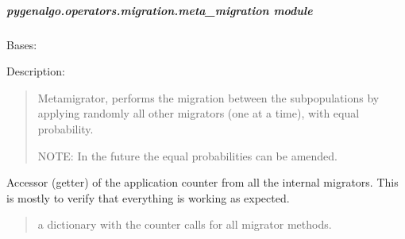\documentclass[letterpaper,10pt,english]{sphinxmanual}
\begin{document}
\subparagraph{pygenalgo.operators.migration.meta\_migration module}
\label{\detokenize{pygenalgo.operators.migration:module-pygenalgo.operators.migration.meta_migration}}\label{\detokenize{pygenalgo.operators.migration:pygenalgo-operators-migration-meta-migration-module}}

\begin{fulllineitems}
\label{\detokenize{pygenalgo.operators.migration:pygenalgo.operators.migration.meta_migration.MetaMigration}}
\pysigstartsignatures
{}
\pysigstopsignatures
\sphinxAtStartPar
Bases: {\hyperref[\detokenize{pygenalgo.operators.migration:pygenalgo.operators.migration.migration_operator.MigrationOperator}]{}}

\sphinxAtStartPar
Description:
\begin{quote}

\sphinxAtStartPar
Meta\sphinxhyphen{}migrator, performs the migration between the subpopulations by applying
randomly all other migrators (one at a time), with equal probability.

\sphinxAtStartPar
NOTE: In the future the equal probabilities can be amended.
\end{quote}

\begin{fulllineitems}
\label{\detokenize{pygenalgo.operators.migration:pygenalgo.operators.migration.meta_migration.MetaMigration.all_counters}}
\pysigstartsignatures
{}
\pysigstopsignatures
\sphinxAtStartPar
Accessor (getter) of the application counter from all the internal migrators.
This is mostly to verify that everything is working as expected.
\begin{quote}\begin{description}
\sphinxAtStartPar
a dictionary with the counter calls for all migrator methods.


\end{description}
\end{quote}
\end{fulllineitems}
\end{fulllineitems}
\end{document}
